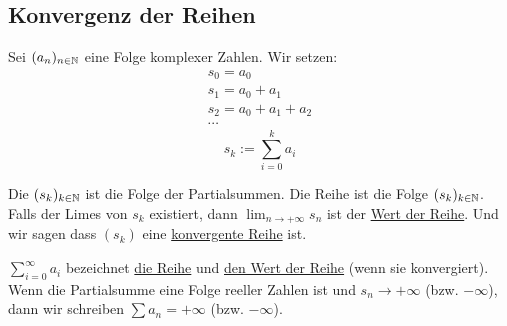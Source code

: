 \subsection{Konvergenz der Reihen}
\begin{Def}
  Sei $(a_n)_{n\in\mathbb{N}}$ eine Folge komplexer Zahlen. Wir setzen:
  \begin{align*}
    s_0=a_0\\
    s_1=a_0+a_1\\
    s_2=a_0+a_1+a_2\\
    \cdots
  \end{align*}
  \begin{equation*}
    s_k:=\sum^k_{i=0}a_i
  \end{equation*}
\end{Def}
\begin{Def}
  Die $(s_k)_{k\in\mathbb{N}}$ ist die Folge der Partialsummen. 
Die Reihe ist die Folge $(s_k)_{k\in\mathbb{N}}$. Falls der Limes 
von $s_k$ existiert, dann $\lim_{n\to+\infty}s_n$ ist der \ul{Wert der Reihe}. 
Und wir sagen dass $(s_k)$ eine \ul{konvergente Reihe} ist.
\end{Def}
\begin{Not}
$\sum^\infty_{i=0}a_i$ bezeichnet \ul{die Reihe} und \ul{den Wert der Reihe}
(wenn sie konvergiert).
 Wenn die Partialsumme eine Folge reeller Zahlen ist und 
$s_n\to+\infty$ (bzw. $-\infty$), dann wir schreiben
$\sum a_n=+\infty$ (bzw. $-\infty$).
\end{Not}

